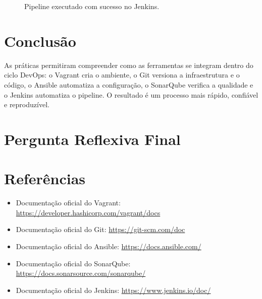 \documentclass[12pt,a4paper]{article}
\begin{document}
\begin{figure}[htbp]
  \centering
  \caption{Pipeline executado com sucesso no Jenkins.}
\end{figure}

\section{Conclus\~ao}

As pr\'aticas permitiram compreender como as ferramentas se integram dentro do
ciclo DevOps: o Vagrant cria o ambiente, o Git versiona a infraestrutura e o
c\'odigo, o Ansible automatiza a configura\c{c}\~ao, o SonarQube verifica a
qualidade e o Jenkins automatiza o pipeline. O resultado \'e um processo mais
r\'apido, confi\'avel e reproduz\'ivel.

\section{Pergunta Reflexiva Final}


\section*{Refer\^encias}

\begin{itemize}
  \item Documenta\c{c}\~ao oficial do Vagrant: \url{https://developer.hashicorp.com/vagrant/docs}
  \item Documenta\c{c}\~ao oficial do Git: \url{https://git-scm.com/doc}
  \item Documenta\c{c}\~ao oficial do Ansible: \url{https://docs.ansible.com/}
  \item Documenta\c{c}\~ao oficial do SonarQube: \url{https://docs.sonarsource.com/sonarqube/}
  \item Documenta\c{c}\~ao oficial do Jenkins: \url{https://www.jenkins.io/doc/}
\end{itemize}
\end{document}
